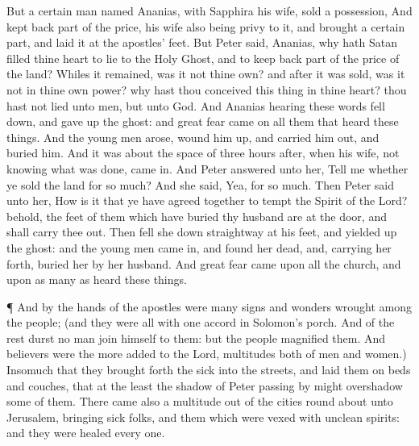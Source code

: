  But a certain man named Ananias, with Sapphira his wife,
sold a possession,  And kept back part of the price, his
wife also being privy to it, and brought a certain part, and laid it at
the apostles' feet.  But Peter said, Ananias, why hath Satan
filled thine heart to lie to the Holy Ghost, and to keep back part of
the price of the land?  Whiles it remained, was it not thine
own? and after it was sold, was it not in thine own power? why hast thou
conceived this thing in thine heart? thou hast not lied unto men, but
unto God.  And Ananias hearing these words fell down, and
gave up the ghost: and great fear came on all them that heard these
things.  And the young men arose, wound him up, and carried
him out, and buried him.  And it was about the space of
three hours after, when his wife, not knowing what was done, came in.
 And Peter answered unto her, Tell me whether ye sold the
land for so much? And she said, Yea, for so much.  Then
Peter said unto her, How is it that ye have agreed together to tempt the
Spirit of the Lord? behold, the feet of them which have buried thy
husband are at the door, and shall carry thee out.  Then
fell she down straightway at his feet, and yielded up the ghost: and the
young men came in, and found her dead, and, carrying her forth, buried
her by her husband.  And great fear came upon all the
church, and upon as many as heard these things.

 ¶ And by the hands of the apostles were many signs and
wonders wrought among the people; (and they were all with one accord in
Solomon's porch.  And of the rest durst no man join himself
to them: but the people magnified them.  And believers were
the more added to the Lord, multitudes both of men and women.)
 Insomuch that they brought forth the sick into the
streets, and laid them on beds and couches, that at the least the shadow
of Peter passing by might overshadow some of them.  There
came also a multitude out of the cities round about unto Jerusalem,
bringing sick folks, and them which were vexed with unclean spirits: and
they were healed every one.

